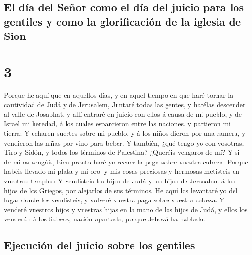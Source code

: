 \hypertarget{el-duxeda-del-seuxf1or-como-el-duxeda-del-juicio-para-los-gentiles-y-como-la-glorificaciuxf3n-de-la-iglesia-de-sion}{%
\subsection{El día del Señor como el día del juicio para los gentiles y
como la glorificación de la iglesia de
Sion}\label{el-duxeda-del-seuxf1or-como-el-duxeda-del-juicio-para-los-gentiles-y-como-la-glorificaciuxf3n-de-la-iglesia-de-sion}}

\hypertarget{section-29-3}{%
\section{3}\label{section-29-3}}

 Porque he aquí que en aquellos días, y en aquel tiempo en
que haré tornar la cautividad de Judá y de Jerusalem, 
Juntaré todas las gentes, y harélas descender al valle de Josaphat, y
allí entraré en juicio con ellos á causa de mi pueblo, y de Israel mi
heredad, á los cuales esparcieron entre las naciones, y partieron mi
tierra:  Y echaron suertes sobre mi pueblo, y á los niños
dieron por una ramera, y vendieron las niñas por vino para beber.
 Y también, ¿qué tengo yo con vosotras, Tiro y Sidón, y
todos los términos de Palestina? ¿Queréis vengaros de mí? Y si de mí os
vengáis, bien pronto haré yo recaer la paga sobre vuestra cabeza.
 Porque habéis llevado mi plata y mi oro, y mis cosas
preciosas y hermosas metisteis en vuestros templos:  Y
vendisteis los hijos de Judá y los hijos de Jerusalem á los hijos de los
Griegos, por alejarlos de sus términos.  He aquí los
levantaré yo del lugar donde los vendisteis, y volveré vuestra paga
sobre vuestra cabeza:  Y venderé vuestros hijos y vuestras
hijas en la mano de los hijos de Judá, y ellos los venderán á los
Sabeos, nación apartada; porque Jehová ha hablado.

\hypertarget{ejecuciuxf3n-del-juicio-sobre-los-gentiles}{%
\subsection{Ejecución del juicio sobre los
gentiles}\label{ejecuciuxf3n-del-juicio-sobre-los-gentiles}}

